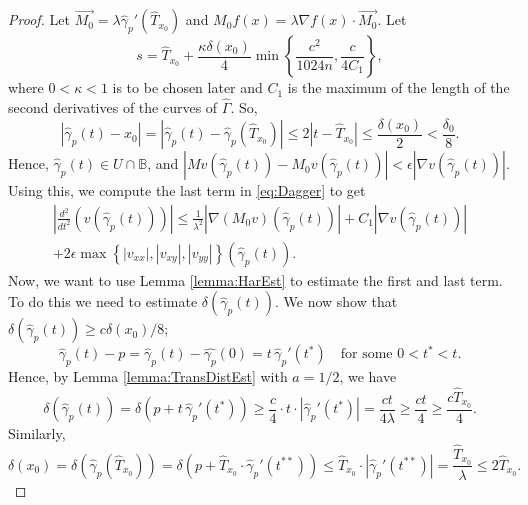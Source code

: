 \documentclass[12pt,a4paper]{amsart}
\numberwithin{equation}{section}
\theoremstyle{definition}
\begin{document}
\begin{proof}
Let $\vec{M_0}= \lambda\widehat{\gamma}_p'(\widehat{T}_{x_0})$ and $M_0 f(x) = \lambda\nabla f(x) \cdot \vec{M_0}$. Let 
\begin{equation}\label{eq:sChoice}
s= \widehat{T}_{x_0}+\dfrac{\kappa\delta(x_0)}{4}\min\left\{\frac{c^2}{1024n} ,\frac{c}{4C_1}\right\},
\end{equation}
where $0 < \kappa < 1$ is to be chosen later and $C_1$ is the maximum of the length of the second derivatives of the curves of $\widehat{\Gamma}$. So, 
\[{\left\lvert{\widehat{\gamma}_p(t) - x_0}\right\rvert} = {\left\lvert{\widehat{\gamma}_p(t) - \widehat{\gamma}_p(\widehat{T}_{x_0})}\right\rvert} \le 2{\left\lvert{t-\widehat{T}_{x_0}}\right\rvert} \le \frac{\delta(x_0)}{2} < \frac{\delta_0}{8}.\]
 Hence, $\widehat{\gamma}_p(t)\in U\cap\mathbb{B}$, and ${\left\lvert{Mv(\widehat{\gamma}_p(t)) - M_0v(\widehat{\gamma}_p(t))}\right\rvert} < \epsilon{\left\lvert{\nabla v(\widehat{\gamma}_p(t))}\right\rvert}$. Using this, we compute the last term in \eqref{eq:Dagger} to get
\begin{multline}\label{eq:DaggerDagger}
{\left\lvert{\frac{d^2}{dt^2}\left(v\left(\widehat{\gamma}_p(t)\right)\right)}\right\rvert} \le \frac{1}{\lambda^2}{\left\lvert{\nabla(M_0 v)(\widehat{\gamma}_p(t))}\right\rvert} + C_1{\left\lvert{\nabla v (\widehat{\gamma}_p(t))}\right\rvert} \\
+ 2\epsilon\max\left\{{\left\lvert{v_{xx}}\right\rvert}, {\left\lvert{v_{xy}}\right\rvert}, {\left\lvert{v_{yy}}\right\rvert}\right\}(\widehat{\gamma}_p(t)).
\end{multline}
Now, we want to use Lemma \ref{lemma:HarEst} to estimate the first and last term. To do this we need to estimate $\displaystyle \delta\left(\widehat{\gamma}_p(t)\right)$. We now show that $\displaystyle \delta\left(\widehat{\gamma}_p(t)\right) \ge c\delta(x_0)/8$;
\[\widehat{\gamma}_p(t) - p = \widehat{\gamma}_p(t) - \widehat{\gamma_p}(0) = t\,\widehat{\gamma}_p'(t^*) \quad\text{for some } 0< t^* < t.\]
Hence, by Lemma \ref{lemma:TransDistEst} with $a=1/2$, we have
\[\delta(\widehat{\gamma}_p(t)) = \delta\left(p+t\, \widehat{\gamma}_p'(t^*)\right) \ge \frac{c}{4}\cdot t\cdot {\left\lvert{\widehat{\gamma}_p'(t^*)}\right\rvert} = \frac{ct}{4\lambda} \ge \frac{ct}{4}\ge \frac{c\widehat{T}_{x_0}}{4}.\]
Similarly,
\[\delta(x_0) = \delta(\widehat{\gamma}_p(\widehat{T}_{x_0})) = \delta\left(p+\widehat{T}_{x_0}\cdot \widehat{\gamma}_p'(t^{**})\right) \le \widehat{T}_{x_0}\cdot{\left\lvert{\widehat{\gamma}_p'(t^{**})}\right\rvert} = \frac{\widehat{T}_{x_0}}{\lambda} \le 2\widehat{T}_{x_0}.\]

\end{proof}
\end{document}
